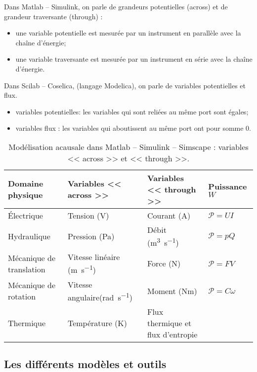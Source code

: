 Dans Matlab -- Simulink, on parle de grandeurs potentielles (across) et de grandeur traversante (through) : 
\begin{itemize}
\item une variable potentielle est mesurée par un instrument
en parallèle avec la chaîne d’énergie;
\item une variable traversante est mesurée par un instrument
en série avec la chaîne d’énergie.
\end{itemize}

Dans Scilab -- Coselica, (langage Modelica), on parle de variables potentielles et flux.
\begin{itemize}
\item variables potentielles: les variables qui sont reliées au même port sont égales;
\item variables flux : les variables qui aboutissent au
même port ont pour somme 0.
\end{itemize}


\begin{table*}[!h]
\caption{Modélisation acausale dans Matlab -- Simulink -- Simscape : variables << across >> et << through >>.}
\begin{tabular}{llll}
\midrule
Domaine physique & Variables << across >> &  Variables << through >> & Puissance $\si{W}$\\ \hline
Électrique & Tension (\si{V})& Courant (\si{A}) & $\mathcal{P}=UI$\\ 
Hydraulique & Pression (\si{Pa})& Débit (\si{m^3.s^{-1}}) & $\mathcal{P}=pQ$\\ 
Mécanique de translation & Vitesse linéaire (\si{m.s^{-1}})& Force (\si{N})& $\mathcal{P}=FV$\\ 
Mécanique de rotation & Vitesse angulaire(\si{rad.s^{-1}}) & Moment (\si{Nm})& $\mathcal{P}=C\omega$\\ 
Thermique & Température (K)& Flux thermique et flux d'entropie & \\ 
\bottomrule
\end{tabular}
\end{table*}

\subsection{Les différents modèles et outils}


